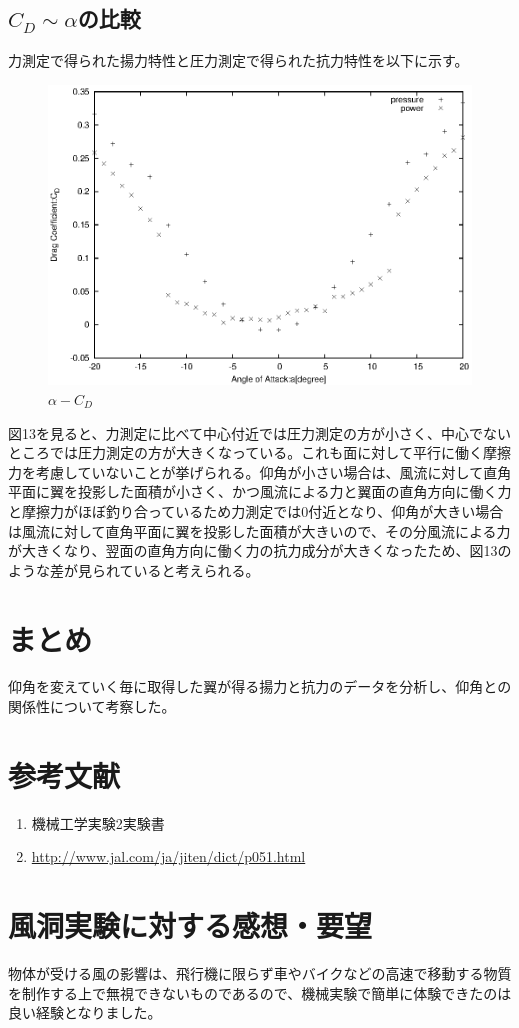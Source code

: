 \documentclass[a4j,twoside,openright,11pt]{jarticle}
\begin{document}
\subsection{$C_D \sim \alpha$の比較}
力測定で得られた揚力特性と圧力測定で得られた抗力特性を以下に示す。
\begin{figure}[]
\begin{center}
\includegraphics[width=12cm]{./2-CL-CD/CD2.eps}
\end{center}
\caption{$\alpha-C_D$}
\end{figure}
図13を見ると、力測定に比べて中心付近では圧力測定の方が小さく、中心でないところでは圧力測定の方が大きくなっている。これも面に対して平行に働く摩擦力を考慮していないことが挙げられる。仰角が小さい場合は、風流に対して直角平面に翼を投影した面積が小さく、かつ風流による力と翼面の直角方向に働く力と摩擦力がほぼ釣り合っているため力測定では0付近となり、仰角が大きい場合は風流に対して直角平面に翼を投影した面積が大きいので、その分風流による力が大きくなり、翌面の直角方向に働く力の抗力成分が大きくなったため、図13のような差が見られていると考えられる。


\section{まとめ}
仰角を変えていく毎に取得した翼が得る揚力と抗力のデータを分析し、仰角との関係性について考察した。

\section{参考文献}
\begin{enumerate}
\item 機械工学実験2実験書
\item \url{http://www.jal.com/ja/jiten/dict/p051.html}
\end{enumerate}

\section{風洞実験に対する感想・要望}
物体が受ける風の影響は、飛行機に限らず車やバイクなどの高速で移動する物質を制作する上で無視できないものであるので、機械実験で簡単に体験できたのは良い経験となりました。
\end{document}
